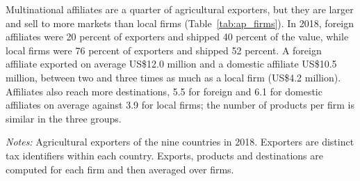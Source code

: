 Multinational affiliates are a quarter of agricultural exporters, but they are larger and sell to more markets
than local firms (Table~\ref{tab:ap_firms}). In 2018, foreign affiliates were 20 percent of exporters and shipped 40
percent of the value, while local firms were 76 percent of exporters and shipped 52 percent. A foreign affiliate
exported on average US\$12.0 million and a domestic affiliate US\$10.5 million, between two and three times as much
as a local firm (US\$4.2 million). Affiliates also reach more destinations, 5.5 for foreign and 6.1 for domestic
affiliates on average against 3.9 for local firms; the number of products per firm is similar in the three groups.
\begin{table}[htbp]
\centering
\caption{Agricultural exporters, by type of owner, 2018}
\label{tab:ap_firms}
{\small\setlength{\tabcolsep}{4pt}\setlength{\extrarowheight}{1pt}
}

\begin{minipage}{0.95\linewidth}
\notesize
\vspace{0.6em}
\textit{Notes:} Agricultural exporters of the nine countries in 2018. Exporters are distinct tax identifiers within each country. Exports, products and destinations are computed for each firm and then averaged over firms.\\
\srcnote
\end{minipage}
\end{table}

